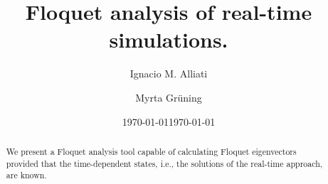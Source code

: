 \documentclass[aps,physrev,preprint,groupedaddress]{revtex4-2}
\date{\today}
\renewcommand{\[}{\left[}
\renewcommand{\]}{\right]}
\renewcommand{\(}{\left(}
\renewcommand{\)}{\right)}
\begin{document}

\title{Floquet analysis of real-time simulations.}


\author{Ignacio M. Alliati}
\affiliation{}
\author{Myrta Gr\"uning}
\affiliation{}



\date{\today}

\begin{abstract}
We present a Floquet analysis tool capable of calculating Floquet eigenvectors provided that the time-dependent states, i.e., the solutions of the real-time approach, are known. 
\end{abstract}


\maketitle

\end{document}
